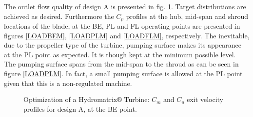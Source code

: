 The outlet flow quality of design A is presented in fig. \ref{out_MAT}. Target distributions are achieved as desired.
Furthermore the $C_p$ profiles at the hub, mid-span and shroud locations of the blade, at the BE, PL and FL operating points are presented in figures \ref{LOADBEM}, \ref{LOADPLM} and \ref{LOADFLM}, respectively. The inevitable, due to the propeller type of the turbine, pumping surface makes its appearance at the PL point as expected. It is though kept at the minimum possible level. The pumping surface spans from the mid-span to the shroud as can be seen in figure \ref{LOADPLM}. In fact, a small pumping surface is allowed at the PL point given that this is a non-regulated machine.            



\begin{figure}[h!]
\begin{minipage}[b]{1\linewidth}
 \centering
\end{minipage}
\caption{Optimization of a Hydromatrix$\circledR$ Turbine: $C_m$ and $C_u$ exit velocity profiles for design A, at the BE point.}
\label{out_MAT}
\end{figure}



